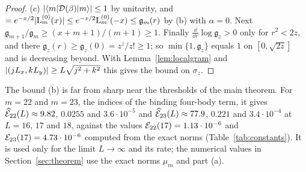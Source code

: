\begin{proof}
(c) $\lvert\langle m\rvert\mathcal{D}(\beta)\lvert m\rangle\rvert\le1$ by unitarity, and $=e^{-x/2}\lvert\mathrm L_m^{(0)}(x)\rvert\le e^{-x/2}\mathrm L_m^{(0)}(-x)\le\mathfrak g_m(r)$ by
(b) with $\alpha=0$. Next $\mathfrak g_{m+1}/\mathfrak g_m\ge(x+m+1)/(m+1)\ge1$. Finally $\frac{\dd}{\dd r}\log\mathfrak g_z>0$ only for
$r^2<2z$, and there $\mathfrak g_z(r)\ge\mathfrak g_z(0)=z^z/z!\ge1$; so $\min\{1,\mathfrak g_z\}$ equals $1$ on $[0,\sqrt{2z}]$ and is
decreasing beyond. With Lemma~\ref{lem:localgram} and $\lvert(jL_x,kL_y)\rvert\ge L\sqrt{j^2+k^2}$ this gives the bound on $\sigma_z$.
\end{proof}

\begin{remark}\label{rem:closedbound}
The bound (b) is far from sharp near the thresholds of the main theorem. For $m=22$ and $m=23$, the indices of the binding
four-body term, it gives $\widehat{\mathcal{E}}_{22}(L)\approx9.82$, $0.0255$ and $3.6\cdot10^{-5}$ and $\widehat{\mathcal{E}}_{23}(L)\approx77.9$,
$0.221$ and $3.4\cdot10^{-4}$ at $L=16$, $17$ and $18$, against the values $\mathcal{E}_{22}(17)=1.13\cdot10^{-6}$ and
$\mathcal{E}_{23}(17)=4.73\cdot10^{-6}$ computed from the exact norms (Table~\ref{tab:constants}). It is used only for the limit
$L\to\infty$ and its rate; the numerical values in Section~\ref{sec:theorem} use the exact norms $\mu_m$ and part (a).
\end{remark}
